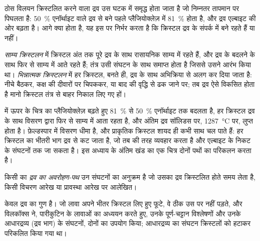 ठोस विलयन क्रिस्टलित करने वाला द्रव उस घटक में समृद्ध होता जाता है जो
निम्नतर तापमान पर पिघलता है: \qty{50}{\percent} एनॉर्थाइट वाले द्रव से बने पहले प्लैजियोक्लेज़ में
\qty{81}{\percent} होता है, और द्रव
एल्बाइट की ओर बढ़ता है। आगे क्या होता है, यह इस पर निर्भर करता है कि क्रिस्टल
द्रव के संपर्क में बने रहते हैं या नहीं।

\begin{definition}[साम्य और भिन्नात्मक क्रिस्टलन]
\label{def:b2:magmatic-differentiation:crystallisation}
\emph{साम्य क्रिस्टलन} में
क्रिस्टल अंत तक पूरे द्रव के साथ रासायनिक साम्य में रहते हैं, और द्रव के बदलने के साथ
फिर से साम्य में आते रहते हैं; तंत्र उसी संघटन के साथ समाप्त होता है
जिससे उसने आरंभ किया था। \emph{भिन्नात्मक क्रिस्टलन}
में हर क्रिस्टल, बनते ही, द्रव के साथ अभिक्रिया से अलग कर दिया जाता है:
नीचे बैठकर, कक्ष की दीवारों पर चिपककर, या बाद की वृद्धि से
ढक जाने पर; तब द्रव ऐसे विकसित होता है मानो क्रिस्टल
तंत्र से बाहर निकाल लिए गए हों।
\end{definition}

 में ऊपर के चित्र का प्लैजियोक्लेज़ बढ़ते हुए
\qty{81}{\percent} से \qty{50}{\percent} एनॉर्थाइट तक बदलता है, हर क्रिस्टल
द्रव के साथ विसरण द्वारा फिर से साम्य में आता रहता है, और अंतिम द्रव
सॉलिडस पर, \qty{1287}{\celsius} पर, लुप्त होता है। फ़ेल्डस्पार में विसरण धीमा है, और प्राकृतिक
क्रिस्टल शायद ही कभी साथ चल पाते हैं: हर क्रिस्टल का भीतरी भाग द्रव से कट जाता है,
जो तब  की तरह व्यवहार करता है और एल्बाइट के निकट के संघटनों तक
जा सकता है। इस अध्याय के अंतिम खंड का एक चित्र दोनों पथों का परिकलन करता है।

\begin{definition}[द्रव का अवरोहण-पथ]\label{def:b2:magmatic-differentiation:lld}
किसी  का \emph{द्रव का अवरोहण-पथ} उन संघटनों का
अनुक्रम है जो उसका द्रव क्रिस्टलित होते समय लेता है, किसी
विचरण आरेख या प्रावस्था आरेख पर आलेखित।
\end{definition}

 केवल द्रव का गुण है। जो लावा अपने भीतर क्रिस्टल लिए हुए फूटे,
वे ठीक उस पर नहीं पड़ते, और विलकॉक्स ने, पारीकुटिन के लावाओं का अध्ययन करते हुए,
उनके पूर्ण-चट्टान विश्लेषणों और उनके आधारद्रव्य (द्रव भाग) के संघटनों, दोनों का उपयोग किया;
आधारद्रव्य का संघटन क्रिस्टलों को हटाकर परिकलित किया गया था।

